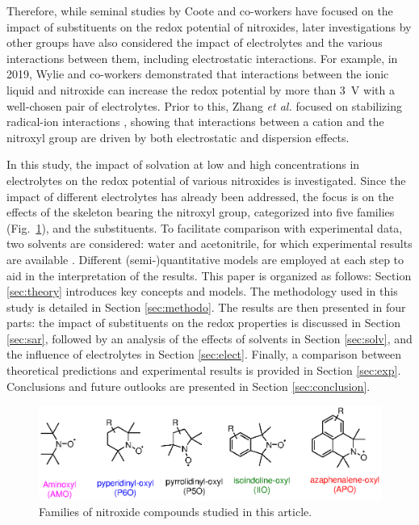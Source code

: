 \documentclass[review,preprint]{elsarticle}
\begin{document}
Therefore, while seminal studies by Coote and co-workers \cite{hodgsonOneElectronOxidationReduction2007,blincoExperimentalTheoreticalStudies2008} have focused on the impact of substituents on the redox potential of nitroxides, later investigations by other groups have also considered the impact of electrolytes and the various interactions between them, including electrostatic interactions. For example, in 2019, Wylie and co-workers \cite{wylieImprovedPerformanceAllOrganic2019a,wylieIncreasedStabilityNitroxide2019b} demonstrated that interactions between the ionic liquid and nitroxide can increase the redox potential by more than \SI{3}{\volt} with a well-chosen pair of electrolytes. Prior to this, Zhang \textit{et al.} focused on stabilizing radical-ion interactions \cite{zhangInteractionsImidazoliumBasedIonic2016,zhangEffectHeteroatomFunctionality2018}, showing that interactions between a cation and the nitroxyl group are driven by both electrostatic and dispersion effects.


In this study, the impact of solvation at low and high concentrations in electrolytes on the redox potential of various nitroxides is investigated. Since the impact of different electrolytes has already been addressed, the focus is on the effects of the skeleton bearing the nitroxyl group, categorized into five families (Fig.~\ref{fig:families}), and the substituents. To facilitate comparison with experimental data, two solvents are considered: water and acetonitrile, for which experimental results are available \cite{morrisChemicalElectrochemicalReduction1991,goldsteinStructureActivityRelationship2006,blincoExperimentalTheoreticalStudies2008,zhangEffectHeteroatomFunctionality2018}. Different (semi-)quantitative models are employed at each step to aid in the interpretation of the results.
This paper is organized as follows: Section \ref{sec:theory} introduces key concepts and models. The methodology used in this study is detailed in Section \ref{sec:methodo}. The results are then presented in four parts: the impact of substituents on the redox properties is discussed in Section \ref{sec:sar}, followed by an analysis of the effects of solvents in Section \ref{sec:solv}, and the influence of electrolytes in Section \ref{sec:elect}. Finally, a comparison between theoretical predictions and experimental results is provided in Section \ref{sec:exp}. Conclusions and future outlooks are presented in Section \ref{sec:conclusion}.

\begin{figure}[!h]
	\centering
	\includegraphics[width=\linewidth]{Figure2}
	\caption{Families of nitroxide compounds studied in this article.}
	\label{fig:families}
\end{figure}
\end{document}
